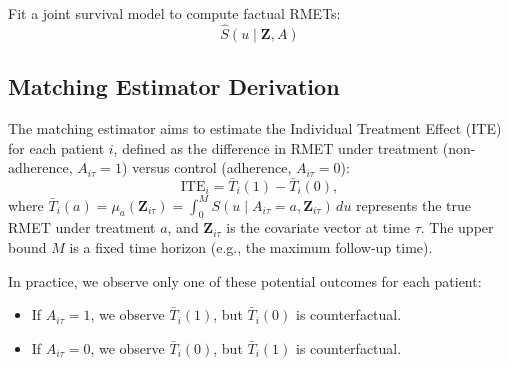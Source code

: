 \begin{algorithm}[t]
\caption{\(K\)-Nearest-Neighbors Matching Estimator}
\label{alg:matching}

Fit a joint survival model to compute factual RMETs:\;
\[
\widehat{S}(u \mid \mathbf{Z}, A)
\]


\Return{
\[
\widehat{\psi}_{\mathrm{match}} = \frac{1}{N} \sum_{i=1}^N \widehat{\mathrm{ITE}}_i
\]
}
\end{algorithm}


\subsection{Matching Estimator Derivation}
\label{apd:matching_derivation}
The matching estimator aims to estimate the Individual Treatment Effect (ITE) for each patient $ i $, defined as the difference in RMET under treatment (non-adherence, $ A_{i\tau} = 1 $) versus control (adherence, $ A_{i\tau} = 0 $):
$$ \text{ITE}_i = \bar{T}_i(1) - \bar{T}_i(0), $$
where $ \bar{T}_i(a) = \mu_a(\mathbf{Z}_{i\tau}) = \int_{0}^{M} S(u \mid A_{i\tau} = a, \mathbf{Z}_{i\tau}) \, du $ represents the true RMET under treatment $ a $, and $ \mathbf{Z}_{i\tau} $ is the covariate vector at time $ \tau $. The upper bound $ M $ is a fixed time horizon (e.g., the maximum follow-up time).

In practice, we observe only one of these potential outcomes for each patient:
\begin{itemize}
    \item If $ A_{i\tau} = 1 $, we observe $ \bar{T}_i(1) $, but $ \bar{T}_i(0) $ is counterfactual.
    \item If $ A_{i\tau} = 0 $, we observe $ \bar{T}_i(0) $, but $ \bar{T}_i(1) $ is counterfactual.
\end{itemize}


